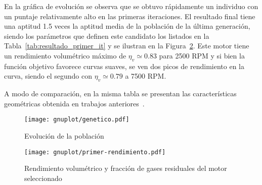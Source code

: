 %
%

En la gráfica de evolución se observa que se obtuvo rápidamente un individuo con
un puntaje relativamente alto en las primeras iteraciones.
%
El resultado final tiene una aptitud 1.5 veces la aptitud media de la población
de la última generación, siendo los parámetros que definen este candidato los
listados en la Tabla~\ref{tab:resultado_primer_it} y se ilustran en la
Figura~\ref{fig:primer_op}.
%
Este motor tiene un rendimiento volumétrico máximo de $\eta_{v} \simeq 0.83$
para 2500 RPM y si bien la función objetivo favorece curvas suaves, se ven dos
picos de rendimiento en la curva, siendo el segundo con $\eta_{v} \simeq 0.79$ a
7500 RPM.

A modo de comparación, en la misma tabla se presentan las características
geométricas obtenida en trabajos anteriores~\parencite{mrcvc_geom}.

\begin{figure}[h!]
  \centering
  \texttt{[image: gnuplot/genetico.pdf]}
  \caption{Evolución de la población} \label{fig:ev_primer_op}
\end{figure}%
\begin{figure}[h!]
  \centering
  \texttt{[image: gnuplot/primer-rendimiento.pdf]}
  \caption{Rendimiento volumétrico y fracción de gases residuales del motor seleccionado} \label{fig:primer_op}
\end{figure}


